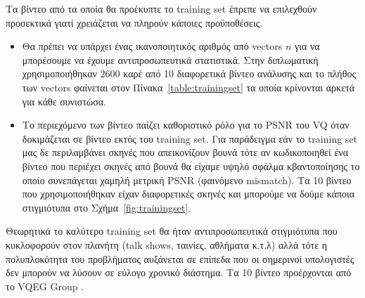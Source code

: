 \indent Τα βίντεο από τα οποία θα προέκυπτε το training set έπρεπε να επιλεχθούν προσεκτικά γιατί χρειάζεται να πληρούν κάποιες προϋποθέσεις.
\begin{itemize}
    \item Θα πρέπει να υπάρχει ένας ικανοποιητικός αριθμός από vectors $n$ για να μπορέσουμε να έχουμε αντιπροσωπευτικά στατιστικά. Στην διπλωματική χρησιμοποιήθηκαν 2600 καρέ από 10 διαφορετικά βίντεο ανάλυσης και το πλήθος των vectors φαίνεται στον Πίνακα~\ref{table:trainingset} τα οποία κρίνονται αρκετά για κάθε συνιστώσα.
    \item Το περιεχόμενο των βίντεο παίζει καθοριστικό ρόλο για το PSNR του VQ όταν δοκιμάζεται σε βίντεο εκτός του training set. Για παράδειγμα εάν το training set μας δε περιλαμβάνει σκηνές που απεικονίζουν βουνά τότε αν κωδικοποιηθεί ένα βίντεο που περιέχει σκηνές από βουνά θα είχαμε υψηλό σφάλμα κβαντοποίησης το οποίο συνεπάγεται χαμηλή μετρική PSNR (φαινόμενο mismatch). Τα 10 βίντεο που χρησιμοποιήθηκαν είχαν διαφορετικές σκηνές και μπορούμε να δούμε κάποια στιγμιότυπα στο Σχήμα~\ref{fig:trainingset}.
\end{itemize}

\indent Θεωρητικά το καλύτερο training set θα ήταν αντιπροσωπευτικά στιγμιότυπα που κυκλοφορούν στον πλανήτη (talk shows, ταινίες, αθλήματα κ.τ.λ) αλλά τότε η πολυπλοκότητα του προβλήματος αυξάνεται σε επίπεδα που οι σημερινοί υπολογιστές δεν μπορούν να λύσουν σε εύλογο χρονικό διάστημα. Τα 10 βίντεο προέρχονται από το VQEG Group \cite{misc:vqeg}.

